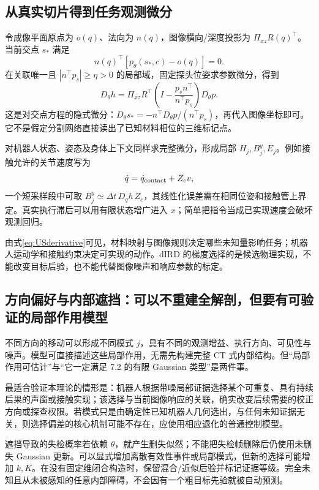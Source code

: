 \documentclass[UTF8,fontset=fandol,11pt,a4paper]{ctexart}
\theoremstyle{definition}\newtheorem{definition}[theorem]{定义}\newtheorem{assumption}[theorem]{条件}
\numberwithin{equation}{section}
\begin{document}
\subsection{从真实切片得到任务观测微分}
令成像平面原点为 $o(q)$、法向为 $n(q)$，图像横向/深度投影为 $\Pi_{xz}R(q)^\top$。当前交点 $s_*$ 满足
\begin{equation}
n(q)^\top[p_\theta(s_*,c)-o(q)]=0.
\end{equation}
在关联唯一且 $|n^\top p_s|\ge\eta>0$ 的局部域，固定探头位姿求参数微分，得到
\begin{equation}
D_\theta h=
\Pi_{xz}R^\top
\left(I-\frac{p_s n^\top}{n^\top p_s}\right)D_\theta p.
\label{eq:USderivative}
\end{equation}
这是对交点方程的隐式微分：$D_\theta s_*=-n^\top D_\theta p/(n^\top p_s)$，再代入图像坐标即可。它不是假定分割网络直接读出了已知材料相位的三维标记点。

对机器人状态、姿态及身体上下文同样求完整微分，形成局部 $H_j,B_j^y,E_j$。例如接触允许的关节速度写为
\[
\dot q=\dot q_{\rm contact}+Z_c v,
\]
一个短采样段中可取 $B_j^y\simeq\Delta t\,D_qh\,Z_c$，其线性化误差需在相同位姿和接触管上界定。真实执行滞后可以用有限状态增广进入 $x$；简单把指令当成已实现速度会破坏观测回归。

由式\eqref{eq:USderivative}可见，材料映射与图像规则决定哪些未知量影响任务；机器人运动学和接触约束决定可实现的动作。dIRD 的梯度选择的是候选物理实现，不能改变目标后验，也不能代替图像噪声和响应参数的标定。

\subsection{方向偏好与内部遮挡：可以不重建全解剖，但要有可验证的局部作用模型}
不同方向的移动可以形成不同模式 $j$，具有不同的观测增益、执行方向、可见性与噪声。模型可直接描述这些局部作用，无需先构建完整 CT 式内部结构。但“局部作用可估计”与“它一定满足 7.2 的有限 Gaussian 类型”是两件事。

最适合验证本理论的情形是：机器人根据带噪局部证据选择某个可重复、具有持续后果的声窗或接触实现；该选择与当前图像响应的关联，确实改变后续需要的校正方向或探查权限。若模式只是由确定性已知机器人几何选出，与任何未知证据无关，则选择偏差的核心机制可能不存在，应使用相应退化的普通控制模型。

遮挡导致的失检概率若依赖 $\theta$，就产生删失似然；不能把失检帧删除后仍使用未删失 Gaussian 更新。可以显式增加离散有效性事件或局部模式，但新的选择可能增加 $k,K$。在没有固定维闭合构造时，保留混合/近似后验并标记证据等级。完全未知且从未被感知的任意内部障碍，不会因有一个粗目标先验就被自动预测。
\end{document}
